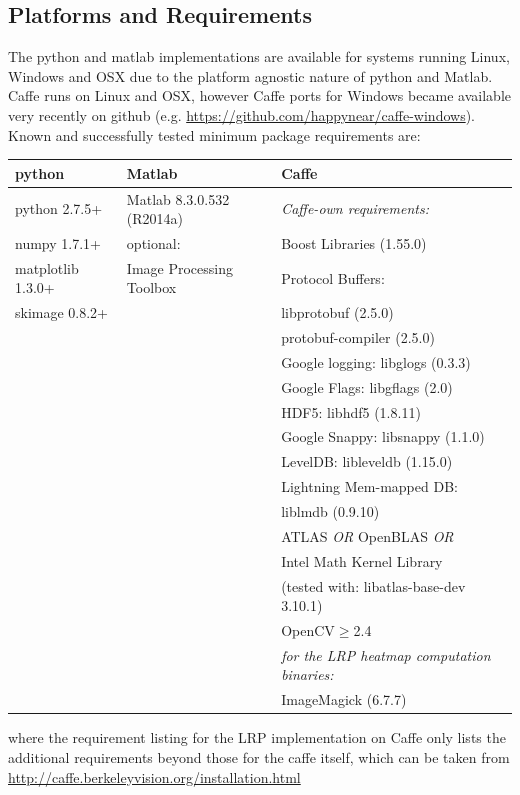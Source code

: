 \documentclass[a4wide]{article}
\begin{document}
\subsection*{Platforms and Requirements}
The python and matlab implementations are available for systems running Linux, Windows and OSX due to the platform agnostic nature of python and Matlab. Caffe runs on Linux and OSX, however Caffe ports for Windows became available very recently on github (e.g. \url{https://github.com/happynear/caffe-windows}). Known and successfully tested minimum package requirements are:
\begin{center}
\begin{tabular}{|l|l|l|}
\hline
\textbf{python} & \textbf{Matlab} & \textbf{Caffe} \\
\hline
python 2.7.5+	& Matlab 8.3.0.532 (R2014a) & \emph{Caffe-own requirements:}   \\
numpy 1.7.1+   & optional:  & Boost Libraries (1.55.0) \\
matplotlib 1.3.0+	   &\hspace{5mm} Image Processing Toolbox&  Protocol Buffers:  \\
skimage 0.8.2+	   & &  \hspace{5mm} libprotobuf (2.5.0)\\
			& & \hspace{5mm} protobuf-compiler (2.5.0)  \\
			& & Google logging: libglogs (0.3.3)\\
	   & &  Google Flags: libgflags (2.0)\\
 & &  HDF5: libhdf5 (1.8.11)  \\
		   & & Google Snappy: libsnappy (1.1.0)\\
 & & LevelDB: libleveldb (1.15.0)\\
 		   & & Lightning Mem-mapped DB: \\
 & & \hspace{5mm}  liblmdb (0.9.10) \\
 & &  ATLAS \emph{OR} OpenBLAS \emph{OR} \\
	& & Intel Math Kernel Library \\
	& & (tested with: libatlas-base-dev 3.10.1) \\
 & &  OpenCV$\ge$2.4   \\\cline{3-3}
& &   \emph{for the LRP heatmap computation binaries:}\\
 & & ImageMagick (6.7.7) \\
\hline
\end{tabular}
\end{center}
where the requirement listing for the LRP implementation on Caffe only lists the additional requirements beyond those for the caffe itself, which can be taken from \url{http://caffe.berkeleyvision.org/installation.html}
\end{document}
